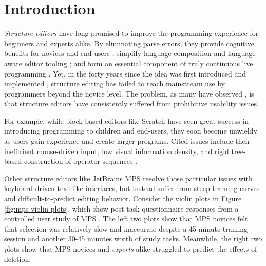 \section{Introduction}\label{sec:intro}

\emph{Structure editors}
have long promised to improve the programming experience
for beginners and experts alike.
By eliminating parse errors,
they provide cognitive benefits for novices
  \cite{meta-analysis-blocks,blocks-text-high-school,coblox}
  and end-users
  \cite{weitnauer2016graspable,rousillon,BasHermans21};
  simplify language composition
  \cite{mbeddr}
  and language-aware editor tooling
  \cite{HazelnutSNAPL};
  and form an essential component of truly continuous live programming
  \cite{Hazelnut,HazelnutLive}.
Yet, in the forty years since the idea was first
introduced and implemented \cite{Cornell},
structure editing has failed to reach
mainstream use by programmers beyond the novice level.
The problem, as many have observed
\cite{user-modeling,fine-tuning-selection-semantics,
practical-lang-based-editing,lang-on-the-usefulness,
psg,Minor92,TowardUserFriendly,MillerPMV94},
is that structure editors have consistently suffered
from prohibitive usability issues.

For example, while
block-based editors like Scratch \cite{scratch}
have seen great success in introducing programming
to children and end-users, they soon become unwieldy
as users gain experience and create larger programs.
Cited issues include their inefficient mouse-driven
input, low visual information density, and rigid
tree-based construction of operator sequences
\cite{BlocksFingertips,cog-dim-blocks,blocks-and-beyond}.

Other structure editors like JetBrains MPS 
resolve those particular issues with
keyboard-driven text-like interfaces, but instead suffer
from steep learning curves and difficult-to-predict
editing behavior.
Consider the violin plots in Figure \ref{fig:mps-violin-plots},
which show post-task questionnaire responses from
a controlled user study of MPS \cite{ProjEfficiency}.
The left two plots show that MPS novices felt that
selection was relatively slow and inaccurate despite
a 45-minute training session and another 30-45 minutes
worth of study tasks.
Meanwhile, the right two plots show that
MPS novices and \emph{experts} alike struggled to
predict the effects of deletion.

